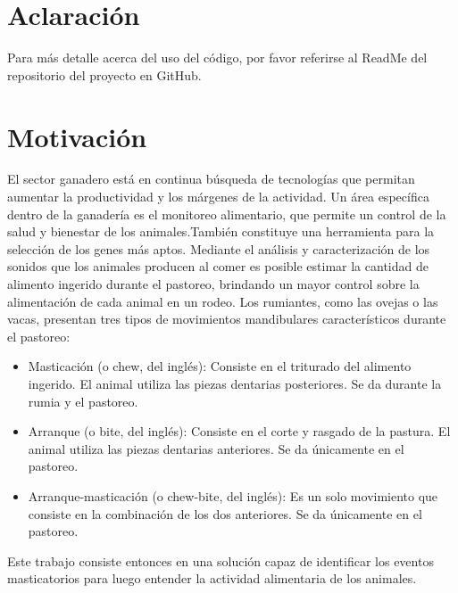 \documentclass[11pt]{charter}
\begin{document}
\maketitle
\thispagestyle{empty}
\pagebreak


\thispagestyle{empty}
{\setlength{\parskip}{0pt}
\tableofcontents{}
}
\pagebreak

\section{Aclaración}
Para más detalle acerca del uso del código, por favor referirse al ReadMe del repositorio del proyecto en GitHub.


\section{Motivación}
\label{sec:descripcion}

El sector ganadero está en continua búsqueda de tecnologías que permitan aumentar la productividad y los márgenes de la actividad. Un área específica dentro de la ganadería es el monitoreo alimentario, que permite un control de la salud y bienestar de los animales.También constituye una herramienta para la selección de los genes más aptos.
Mediante el análisis y caracterización de los sonidos que los animales producen al comer es posible estimar la cantidad de alimento ingerido durante el pastoreo, brindando un mayor control sobre la alimentación de cada animal en un rodeo.
Los rumiantes, como las ovejas o las vacas, presentan tres tipos de movimientos
mandibulares característicos durante el pastoreo:
\begin{itemize}
	\item Masticación (o chew, del inglés): Consiste en el triturado del alimento ingerido. El animal utiliza las piezas dentarias posteriores. Se da durante la rumia y el pastoreo.
	\item Arranque (o bite, del inglés): Consiste en el corte y rasgado de la pastura. El animal utiliza las piezas dentarias anteriores. Se da únicamente en el pastoreo.
	\item Arranque-masticación (o chew-bite, del inglés): Es un solo movimiento que consiste en la combinación de los dos anteriores. Se da únicamente en el pastoreo.
 
\end{itemize}

Este trabajo consiste entonces en una solución capaz de identificar los eventos masticatorios para luego entender la actividad alimentaria de los animales.
\end{document}

